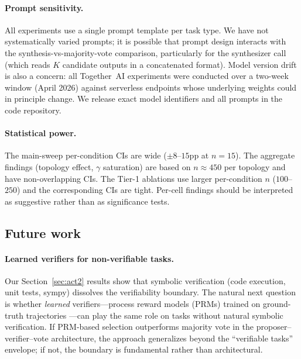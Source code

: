 \documentclass[11pt]{amsart}
\newcommand{\g}{\gamma}
\newcommand\1{{\mathds{1}}}
\theoremstyle{definition}
\theoremstyle{remark}
\numberwithin{equation}{section}
\begin{document}
\paragraph{Prompt sensitivity.}
All experiments use a single prompt template per task type.
We have not systematically varied prompts; it is possible that prompt design interacts with the synthesis-vs-majority-vote comparison, particularly for the synthesizer call (which reads $K$ candidate outputs in a concatenated format).
Model version drift is also a concern: all Together~AI experiments were conducted over a two-week window (April 2026) against serverless endpoints whose underlying weights could in principle change.
We release exact model identifiers and all prompts in the code repository.

\paragraph{Statistical power.}
The main-sweep per-condition CIs are wide ($\pm 8$--$15$pp at $n = 15$).
The aggregate findings (topology effect, $\g$ saturation) are based on $n \approx 450$ per topology and have non-overlapping CIs.
The Tier-1 ablations use larger per-condition $n$ ($100$--$250$) and the corresponding CIs are tight.
Per-cell findings should be interpreted as suggestive rather than as significance tests.

\subsection{Future work}\label{sec:future}

\paragraph{Learned verifiers for non-verifiable tasks.}
Our Section~\ref{sec:act2} results show that symbolic verification (code execution, unit tests, sympy) dissolves the verifiability boundary.
The natural next question is whether \emph{learned} verifiers---process reward models (PRMs) trained on ground-truth trajectories \cite{Lightman2023PRM}---can play the same role on tasks without natural symbolic verification.
If PRM-based selection outperforms majority vote in the proposer--verifier--vote architecture, the approach generalizes beyond the ``verifiable tasks'' envelope; if not, the boundary is fundamental rather than architectural.
\end{document}
